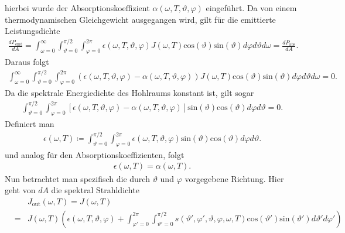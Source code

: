 \documentclass{book}
\renewcommand{\sin}{\text{sin}}
\renewcommand{\cos}{\text{cos}}
\begin{document}
%
hierbei wurde der Absorptionskoeffizient $\alpha\left(\omega, T, \vartheta, \varphi\right)$ eingeführt. Da von einem thermodynamischen Gleichgewicht ausgegangen wird, gilt für die emittierte Leistungsdichte
%
\begin{eqnarray}
\frac{dP_{\text{emt}}}{dA} = \int_{\omega = 0}^\infty\int_{\vartheta = 0}^{\pi/2}\int_{\varphi = 0}^{2\pi}\epsilon\left(\omega, T, \vartheta, \varphi\right)J\left(\omega, T\right)\cos\left(\vartheta\right)\sin\left(\vartheta\right)d\varphi d\vartheta d\omega = \frac{dP_{\text{abs}}}{dA}.
\end{eqnarray}
%
Daraus folgt
%
\begin{eqnarray}
\int_{\omega = 0}^\infty\int_{\vartheta = 0}^{\pi/2}\int_{\varphi = 0}^{2\pi}\left(\epsilon\left(\omega, T, \vartheta, \varphi\right) - \alpha\left(\omega, T, \vartheta, \varphi\right)\right)J\left(\omega, T\right)\cos\left(\vartheta\right)\sin\left(\vartheta\right)d\varphi d\vartheta d\omega = 0.
\end{eqnarray}
%
Da die spektrale Energiedichte des Hohlraums konstant ist, gilt sogar
%
\begin{eqnarray}
\int_{\vartheta = 0}^{\pi/2}\int_{\varphi = 0}^{2\pi}\left[\epsilon\left(\omega, T, \vartheta, \varphi\right) - \alpha\left(\omega, T, \vartheta, \varphi\right)\right]\sin\left(\vartheta\right)\cos\left(\vartheta\right)d\varphi d\vartheta = 0.
\end{eqnarray}
%
Definiert man
%
\begin{eqnarray}
\epsilon\left(\omega, T\right) \coloneqq\int_{\vartheta = 0}^{\pi/2}\int_{\varphi = 0}^{2\pi}\epsilon\left(\omega, T, \vartheta, \varphi\right)\sin\left(\vartheta\right)\cos\left(\vartheta\right)d\varphi d\vartheta.
\end{eqnarray}
%
und analog für den Absorptionskoeffizienten, folgt
%
\begin{eqnarray}
\epsilon\left(\omega, T\right) = \alpha\left(\omega, T\right).
\end{eqnarray}
%
Nun betrachtet man spezifisch die durch $\vartheta$ und $\varphi$ vorgegebene Richtung. Hier geht von $dA$ die spektral Strahldichte
%
\begin{eqnarray}
&&J_\text{out}\left(\omega, T\right) = J\left(\omega, T\right)\nonumber\\
& = & J\left(\omega, T\right)\left(\epsilon\left(\omega, T, \vartheta, \varphi\right) + \int_{\varphi' = 0}^{2\pi}\int_{\vartheta' = 0}^{\pi/2}s\left(\vartheta', \varphi', \vartheta, \varphi, \omega, T\right)\cos\left(\vartheta'\right)\sin\left(\vartheta'\right)d\vartheta'd\varphi'\right)
\end{eqnarray}
\end{document}
